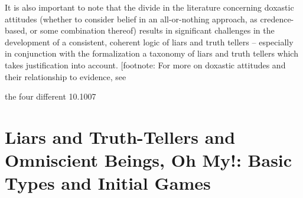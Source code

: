 \documentclass[12pt, titlepage, twoside, a4paper]{report}
\begin{document}
It is also important to note that the divide in the literature concerning doxastic attitudes (whether to consider belief in an all-or-nothing approach, as credence-based, or some combination thereof) results in significant challenges in the development of a consistent, coherent logic of liars and truth tellers – especially in conjunction with the formalization a taxonomy of liars and truth tellers which takes justification into account. [footnote: For more on doxastic attitudes and their relationship to evidence, see {the four different 10.1007%

\chapter{Liars and Truth-Tellers and Omniscient Beings, Oh My!: Basic Types and Initial Games}
}
\end{document}
